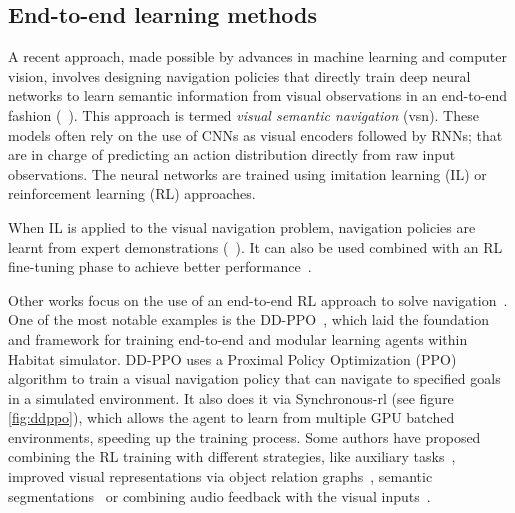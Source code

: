 \subsection{End-to-end learning methods}\label{subsec:end-to-end-learning-methods}

A recent approach, made possible by advances in machine learning and computer vision, involves designing navigation policies that directly train deep neural networks to learn semantic information from visual observations in an end-to-end fashion (\eg~\cite{ramrakhya2022, yadav2022, gutierrez2019, khandelwal2022, chaplot2020,chang2020}).
This approach is termed \textit{visual semantic navigation} (\acrshort{vsn}).
These models often rely on the use of CNNs as visual encoders followed by RNNs; that are in charge of predicting an action distribution directly from raw input observations.
The neural networks are trained using imitation learning (IL) or reinforcement learning (RL) approaches.

When IL is applied to the visual navigation problem, navigation policies are learnt from expert demonstrations (\eg~\cite{ramrakhya2022,yadav2022}).
It can also be used combined with an RL fine-tuning phase to achieve better performance~\cite{ramrakhya2023}.

Other works focus on the use of an end-to-end RL approach to solve \objnav navigation~\cite{zhu2017, gutierrez2019, khandelwal2022, Liu2022, Yadav2023OVRLV2AS, Xu2024DeepRL, YokoyamaHM3DOVONAD}.
One of the most notable examples is the DD-PPO~\cite{wijmans2020}, which laid the foundation and framework for training end-to-end and modular learning agents within Habitat simulator.
DD-PPO uses a Proximal Policy Optimization (PPO)~\cite{schulman2017} algorithm to train a visual navigation policy that can navigate to specified goals in a simulated environment.
It also does it via Synchronous-\acrshort{rl} (see figure \ref{fig:ddppo}), which allows the agent to learn from multiple GPU batched environments, speeding up the training process.
Some authors have proposed combining the RL training with different strategies, like auxiliary tasks~\cite{ye2021}, improved visual representations via object relation graphs~\cite{yang2018}, semantic segmentations~\cite{Mousavian2018} or combining audio feedback with the visual inputs~\cite{Wang2023, Kondoh2023MultigoalAN}.

